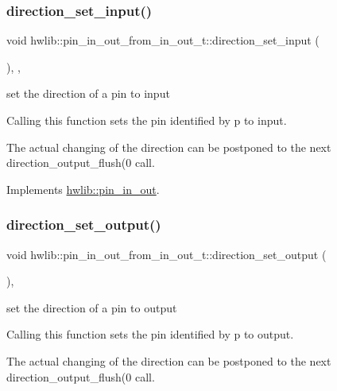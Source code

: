 \subsubsection{\texorpdfstring{direction\+\_\+set\+\_\+input()}{direction\_set\_input()}}
{\footnotesize\ttfamily void hwlib\+::pin\+\_\+in\+\_\+out\+\_\+from\+\_\+in\+\_\+out\+\_\+t\+::direction\+\_\+set\+\_\+input (\begin{DoxyParamCaption}{ }\end{DoxyParamCaption})\hspace{0.3cm}{\ttfamily [inline]}, {\ttfamily [override]}, {\ttfamily [virtual]}}

set the direction of a pin to input

Calling this function sets the pin identified by p to input.

The actual changing of the direction can be postponed to the next direction\+\_\+output\+\_\+flush(0 call. 

Implements \hyperlink{classhwlib_1_1pin__in__out_a54ce1a5086d3c9e7b868511b1d46acd0}{hwlib\+::pin\+\_\+in\+\_\+out}.

\mbox{\label{classhwlib_1_1pin__in__out__from__in__out__t_a6c0f6e7f37e52cc1d6fec7932a024cb1}} 
\subsubsection{\texorpdfstring{direction\+\_\+set\+\_\+output()}{direction\_set\_output()}}
{\footnotesize\ttfamily void hwlib\+::pin\+\_\+in\+\_\+out\+\_\+from\+\_\+in\+\_\+out\+\_\+t\+::direction\+\_\+set\+\_\+output (\begin{DoxyParamCaption}{ }\end{DoxyParamCaption})\hspace{0.3cm}{\ttfamily [inline]}, {\ttfamily [virtual]}}

set the direction of a pin to output

Calling this function sets the pin identified by p to output.

The actual changing of the direction can be postponed to the next direction\+\_\+output\+\_\+flush(0 call. 

